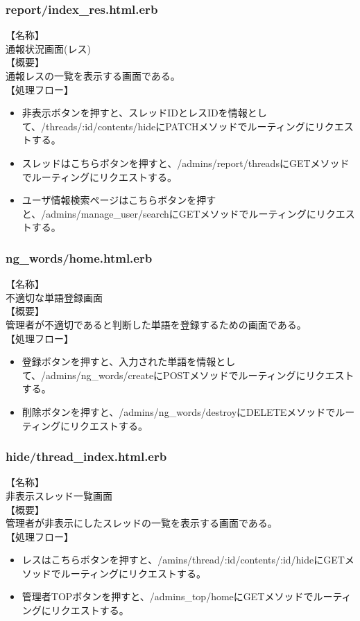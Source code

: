 \documentclass[a4j]{jarticle}
\begin{document}
\subsubsection{report/index\_res.html.erb}
\noindent
【名称】\\
通報状況画面(レス)\\
【概要】\\
通報レスの一覧を表示する画面である。\\
【処理フロー】
\begin{itemize}
  \item 非表示ボタンを押すと、スレッドIDとレスIDを情報として、/threads/:id/contents/hideにPATCHメソッドでルーティングにリクエストする。
  \item スレッドはこちらボタンを押すと、/admins/report/threadsにGETメソッドでルーティングにリクエストする。
  \item ユーザ情報検索ページはこちらボタンを押すと、/admins/manage\_user/searchにGETメソッドでルーティングにリクエストする。
\end{itemize}

\subsubsection{ng\_words/home.html.erb}
\noindent
【名称】\\
不適切な単語登録画面\\
【概要】\\
管理者が不適切であると判断した単語を登録するための画面である。\\
【処理フロー】
\begin{itemize}
  \item 登録ボタンを押すと、入力された単語を情報として、/admins/ng\_words/createにPOSTメソッドでルーティングにリクエストする。
  \item 削除ボタンを押すと、/admins/ng\_words/destroyにDELETEメソッドでルーティングにリクエストする。
\end{itemize}

\subsubsection{hide/thread\_index.html.erb}
\noindent
【名称】\\
非表示スレッド一覧画面\\
【概要】\\
管理者が非表示にしたスレッドの一覧を表示する画面である。\\
【処理フロー】
\begin{itemize}
  \item レスはこちらボタンを押すと、/amins/thread/:id/contents/:id/hideにGETメソッドでルーティングにリクエストする。
  \item 管理者TOPボタンを押すと、/admins\_top/homeにGETメソッドでルーティングにリクエストする。
\end{itemize}
\end{document}
